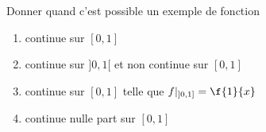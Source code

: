 
\begin{exercice}\label{exocontinueSupl1}

Donner quand c'est possible un exemple de fonction
\begin{enumerate}
\item continue sur $[0,1]$
\item continue sur $]0,1[$ et non continue sur  $[0,1]$
\item continue sur $[0,1]$ telle que  $f|_{]0,1]} = \f{1}{x}$
\item continue nulle part sur $[0,1]$
\end{enumerate}

\end{exercice}
